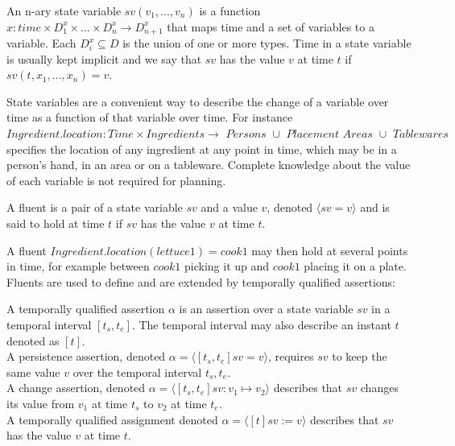 \begin{definition}
  An n-ary state variable $sv(v_1,...,v_n)$ is a function $x: time \times D_1^x \times \dots \times D_n^x \rightarrow D_{n+1}^x$ that maps time and a set of variables to a variable.
  Each $D_i^x \subseteq D$ is the union of one or more types.
  Time in a state variable is usually kept implicit and we say that $sv$ has the value $v$ at time $t$ if $sv(t,x_1,...,x_n) = v$.
\end{definition}

State variables are a convenient way to describe the change of a variable over time as a function of that variable over time.
For instance $Ingredient.location: Time \times \textit{Ingredients} \rightarrow \textit{ Persons } \cup \textit{ Placement Areas } \cup \textit{ Tablewares }$ specifies the location of any ingredient at any point in time, which may be in a person's hand, in an area or on a tableware.
Complete knowledge about the value of each variable is not required for planning.

\begin{definition}[Fluent]
  A fluent is a pair of a state variable $sv$ and a value $v$, denoted $\langle sv=v \rangle$ and is said to hold at time $t$ if $sv$ has the value $v$ at time $t$.
\end{definition}

A fluent $Ingredient.location(lettuce1) = cook1$ may then hold at several points in time, for example between $cook1$ picking it up and $cook1$ placing it on a plate.
Fluents are used to define and are extended by temporally qualified assertions:

\begin{definition}
  A temporally qualified assertion $\alpha$ is an assertion over a state variable $sv$ in a temporal interval $[t_s,t_e]$.
  The temporal interval may also describe an instant $t$ denoted as $[t]$.\\
  A persistence assertion, denoted $\alpha = \langle [t_s,t_e] sv=v \rangle$, requires $sv$ to keep the same value $v$ over the temporal interval $t_s,t_e$.\\
  A change assertion, denoted $\alpha = \langle [t_s,t_e] sv : v_1 \mapsto v_2 \rangle$ describes that $sv$ changes its value from $v_1$ at time $t_s$ to $v_2$ at time $t_e$. \\
  A temporally qualified assignment denoted $\alpha = \langle [t] sv := v \rangle$ describes that $sv$ has the value $v$ at time $t$.
\end{definition}

